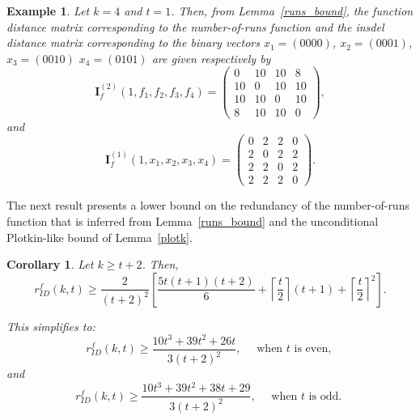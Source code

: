 \documentclass[11 pt]{article}
\numberwithin{equation}{section}
\newtheorem{corollary}[theorem]{Corollary}
\newtheorem{example}[theorem]{Example}
\begin{document}
    
    \begin{example}
        Let \( k = 4 \) and \( t = 1 \). Then, from Lemma~\ref{runs_bound}, the function distance matrix corresponding to the number-of-runs function and the insdel distance matrix corresponding to the binary vectors $x_1 = (0000)$, $x_2 = (0001)$, $x_3 = (0010)$  $x_4 = (0101)$ are given respectively by
        \[
            \bm{I}_f^{(2)}(1, f_1, f_2, f_3, f_4) =
            \begin{pmatrix}
                0 & 10 & 10 & 8 \\[4pt]
                10 & 0 & 10 & 10 \\[4pt]
                10 & 10 & 0 & 10 \\[4pt]
                8 & 10 & 10 & 0
            \end{pmatrix},
        \]
        and
        \[
            \bm{I}_{\textit{f}}^{(1)}(1, x_1, x_2, x_3, x_4) =
            \begin{pmatrix}
                0 & 2 & 2 & 0\\[4pt]
                2 & 0 & 2 & 2\\[4pt]
                2 & 2 & 0 & 2\\[4pt]
                2 & 2 & 2 & 0
            \end{pmatrix}.
        \]  
    \end{example}
    The next result presents a lower bound on the redundancy of the number-of-runs function that is inferred from Lemma~\ref{runs_bound} and the unconditional Plotkin-like bound of Lemma~\ref{plotk}.
    
    \begin{corollary}\label{common_lower}
        Let $k \geq t+2$. Then,
        {
            \[
            r_{ID}^f(k,t) \geq \frac{2}{(t+2)^2}\left[\frac{5t(t+1)(t+2)}{6} + \left \lceil\frac{t}{2} \right \rceil (t+1) + \left \lceil\frac{t}{2} \right \rceil^2\right].
            \]
        }
        
        This simplifies to:
        $$ r_{ID}^f(k,t) \geq \frac{10t^3 + 39t^2 + 26t}{3(t+2)^2}, \quad \text{ when $t$ is even, }$$
        and $$ r_{ID}^f(k,t) \geq \frac{10t^3 + 39t^2 + 38t + 29}{3(t+2)^2}, \quad \text{ when $t$ is odd. }$$       
    \end{corollary}
    
\end{document}
